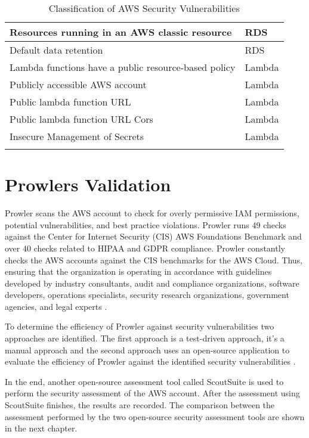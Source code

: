 \begin{longtable}{|p{12cm}|p{2.4cm}|}
    \hline
    Resources running in an AWS classic resource & RDS \\
    \hline
    Default data retention & RDS \\
    \hline
    Lambda functions have a public resource-based policy & Lambda \\
    \hline
    Publicly accessible AWS account & Lambda \\
    \hline
    Public lambda function URL & Lambda \\
    \hline
    Public lambda function URL Cors & Lambda \\
    \hline
    Insecure Management of Secrets & Lambda \\
    \hline

    \caption{Classification of AWS Security Vulnerabilities}
    \label{tab:classificationofsecurityvulnerabilities}
\end{longtable}

\section{Prowlers Validation}

\par Prowler scans the AWS account to check for overly permissive IAM permissions, potential vulnerabilities, and best practice violations. Prowler runs 49 checks against the Center for Internet Security (CIS) AWS Foundations Benchmark and over 40 checks related to HIPAA and GDPR compliance. Prowler constantly checks the AWS accounts against the CIS benchmarks for the AWS Cloud. Thus, ensuring that the organization is operating in accordance with guidelines developed by industry consultants, audit and compliance organizations, software developers, operations specialists, security research organizations, government agencies, and legal experts \cite{66}.

\par To determine the efficiency of Prowler against security vulnerabilities two approaches are identified.
The first approach is a test-driven approach, it’s a manual approach and the second approach uses an open-source application to evaluate the efficiency of Prowler against the identified security vulnerabilities \cite{37}.

\par In the end, another open-source assessment tool called ScoutSuite is used to perform the security assessment of the AWS account.
After the assessment using ScoutSuite finishes, the results are recorded.
The comparison between the assessment performed by the two open-source security
assessment tools are shown in the next chapter.

